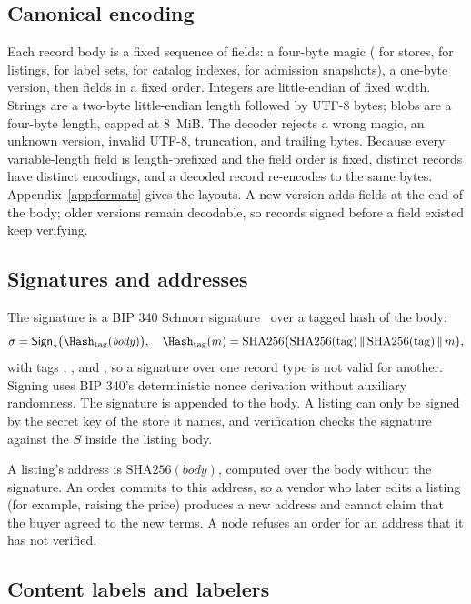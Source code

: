 \subsection{Canonical encoding}

Each record body is a fixed sequence of fields: a four-byte magic ( for stores,  for listings,  for label sets,  for catalog indexes,  for admission snapshots), a one-byte version, then fields in a fixed order. Integers are little-endian of fixed width. Strings are a two-byte little-endian length followed by UTF-8 bytes; blobs are a four-byte length, capped at 8~MiB. The decoder rejects a wrong magic, an unknown version, invalid UTF-8, truncation, and trailing bytes. Because every variable-length field is length-prefixed and the field order is fixed, distinct records have distinct encodings, and a decoded record re-encodes to the same bytes. Appendix~\ref{app:formats} gives the layouts. A new version adds fields at the end of the body; older versions remain decodable, so records signed before a field existed keep verifying.

\subsection{Signatures and addresses}

The signature is a BIP 340 Schnorr signature~\citep{bip340} over a tagged hash of the body:
\[
  \sigma = \mathsf{Sign}_{s}\bigl(\Hash_{\mathrm{tag}}(\mathit{body})\bigr),\quad \Hash_{\mathrm{tag}}(m)=\mathrm{SHA256}\bigl(\mathrm{SHA256}(\mathrm{tag})\,\|\,\mathrm{SHA256}(\mathrm{tag})\,\|\,m\bigr),
\]
with tags , , and , so a signature over one record type is not valid for another. Signing uses BIP 340's deterministic nonce derivation without auxiliary randomness. The signature is appended to the body. A listing can only be signed by the secret key of the store it names, and verification checks the signature against the $S$ inside the listing body.

A listing's address is $\mathrm{SHA256}(\mathit{body})$, computed over the body without the signature. An order commits to this address, so a vendor who later edits a listing (for example, raising the price) produces a new address and cannot claim that the buyer agreed to the new terms. A node refuses an order for an address that it has not verified.

\subsection{Content labels and labelers}
\label{sec:labels}

